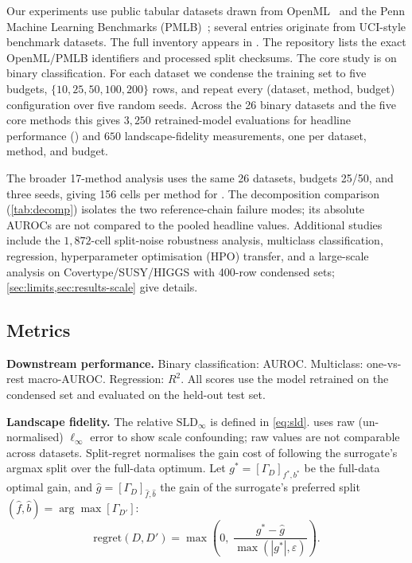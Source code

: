 Our experiments use public tabular datasets drawn from
OpenML~\cite{vanschoren2013openml} and the Penn Machine Learning Benchmarks
(PMLB)~\cite{olson2017pmlb}; several entries originate from UCI-style benchmark
datasets. The full inventory appears in . The repository
lists the exact OpenML/PMLB identifiers and processed split checksums. The core
study is on binary classification. For each dataset we
condense the training set to five budgets, $\{10, 25, 50, 100, 200\}$ rows, and
repeat every (dataset, method, budget) configuration over five random seeds.
Across the 26 binary datasets and the five core methods this gives $3{,}250$
retrained-model evaluations for headline performance () and
$650$ landscape-fidelity measurements, one per dataset, method, and budget.

The broader 17-method analysis uses the same 26 datasets, budgets 25/50, and
three seeds, giving 156 cells per method for . The
decomposition comparison (\cref{tab:decomp}) isolates the two reference-chain
failure modes; its absolute AUROCs are not compared to the pooled headline
values. Additional studies include the $1{,}872$-cell split-noise robustness
analysis, multiclass classification, regression, hyperparameter optimisation
(HPO) transfer, and a large-scale analysis on Covertype/SUSY/HIGGS with 400-row
condensed sets; \cref{sec:limits,sec:results-scale} give details.

\subsection{Metrics}

\textbf{Downstream performance.}
Binary classification: AUROC. Multiclass: one-vs-rest macro-AUROC.
Regression: $R^2$. All scores use the model retrained on the condensed set
and evaluated on the held-out test set.

\textbf{Landscape fidelity.}
The relative $\mathrm{SLD}_\infty$ is defined in \eqref{eq:sld}.
 uses raw (un-normalised) $\ell_\infty$ error to show
scale confounding; raw values are not comparable across datasets.
Split-regret normalises the gain cost of following the surrogate's argmax
split over the full-data optimum. Let $g^* = [\Gamma_D]_{f^*,b^*}$ be the
full-data optimal gain, and $\hat{g} = [\Gamma_D]_{\hat{f},\hat{b}}$ the gain
of the surrogate's preferred split $(\hat{f},\hat{b})=\arg\max[\Gamma_{D'}]$:
\begin{equation}
\mathrm{regret}(D,D') = \max\!\left(0,\;\frac{g^* - \hat{g}}
                                              {\max(|g^*|,\varepsilon)}\right).
\label{eq:regret}
\end{equation}

